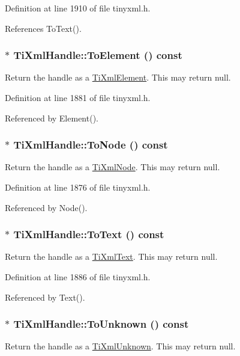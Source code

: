 Definition at line 1910 of file tinyxml.h.

References ToText().\hypertarget{class_ti_xml_handle_abc6e7ed383a5fe1e52b0c0004b457b9e}{
\subsubsection[{ToElement}]{$\ast$ TiXmlHandle::ToElement () const}}
\label{class_ti_xml_handle_abc6e7ed383a5fe1e52b0c0004b457b9e}
Return the handle as a \hyperlink{class_ti_xml_element}{TiXmlElement}. This may return null. 

Definition at line 1881 of file tinyxml.h.

Referenced by Element().\hypertarget{class_ti_xml_handle_af678e5088e83be67baf76f699756f2c3}{
\subsubsection[{ToNode}]{$\ast$ TiXmlHandle::ToNode () const}}
\label{class_ti_xml_handle_af678e5088e83be67baf76f699756f2c3}
Return the handle as a \hyperlink{class_ti_xml_node}{TiXmlNode}. This may return null. 

Definition at line 1876 of file tinyxml.h.

Referenced by Node().\hypertarget{class_ti_xml_handle_a4ac53a652296203a5b5e13854d923586}{
\subsubsection[{ToText}]{$\ast$ TiXmlHandle::ToText () const}}
\label{class_ti_xml_handle_a4ac53a652296203a5b5e13854d923586}
Return the handle as a \hyperlink{class_ti_xml_text}{TiXmlText}. This may return null. 

Definition at line 1886 of file tinyxml.h.

Referenced by Text().\hypertarget{class_ti_xml_handle_a1381c17507a130767b1e23afc93b3674}{
\subsubsection[{ToUnknown}]{$\ast$ TiXmlHandle::ToUnknown () const}}
\label{class_ti_xml_handle_a1381c17507a130767b1e23afc93b3674}
Return the handle as a \hyperlink{class_ti_xml_unknown}{TiXmlUnknown}. This may return null. 

